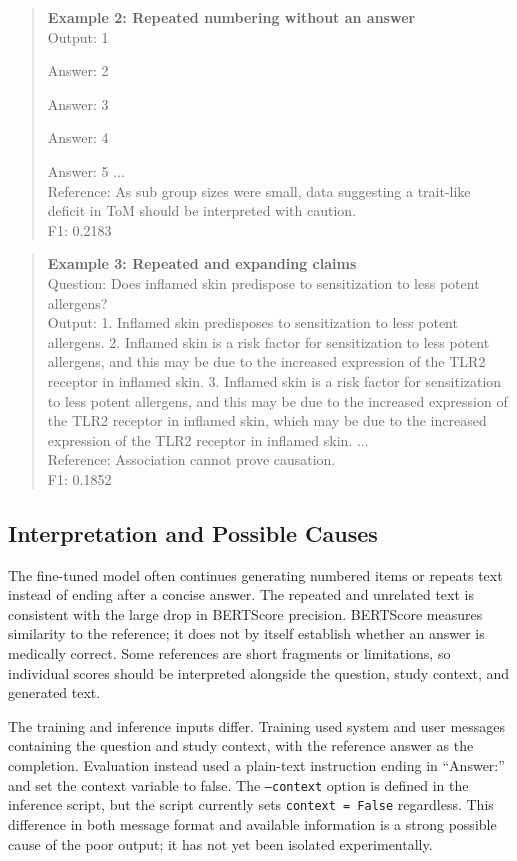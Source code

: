 \begin{quote}
\textbf{Example 2: Repeated numbering without an answer}\\
Output: 1

Answer: 2

Answer: 3

Answer: 4

Answer: 5 ...\\
Reference: As sub group sizes were small, data suggesting a trait-like deficit in ToM should be interpreted with caution.\\
F1: 0.2183
\end{quote}

\begin{quote}
\textbf{Example 3: Repeated and expanding claims}\\
Question: Does inflamed skin predispose to sensitization to less potent allergens?\\
Output: 1. Inflamed skin predisposes to sensitization to less potent allergens. 2. Inflamed skin is a risk factor for sensitization to less potent allergens, and this may be due to the increased expression of the TLR2 receptor in inflamed skin. 3. Inflamed skin is a risk factor for sensitization to less potent allergens, and this may be due to the increased expression of the TLR2 receptor in inflamed skin, which may be due to the increased expression of the TLR2 receptor in inflamed skin. ...\\
Reference: Association cannot prove causation.\\
F1: 0.1852
\end{quote}

\subsection{Interpretation and Possible Causes}

The fine-tuned model often continues generating numbered items or repeats text instead of ending after a concise answer. The repeated and unrelated text is consistent with the large drop in BERTScore precision. BERTScore measures similarity to the reference; it does not by itself establish whether an answer is medically correct. Some references are short fragments or limitations, so individual scores should be interpreted alongside the question, study context, and generated text.

The training and inference inputs differ. Training used system and user messages containing the question and study context, with the reference answer as the completion. Evaluation instead used a plain-text instruction ending in ``Answer:'' and set the context variable to false. The \texttt{--context} option is defined in the inference script, but the script currently sets \texttt{context = False} regardless. This difference in both message format and available information is a strong possible cause of the poor output; it has not yet been isolated experimentally.

